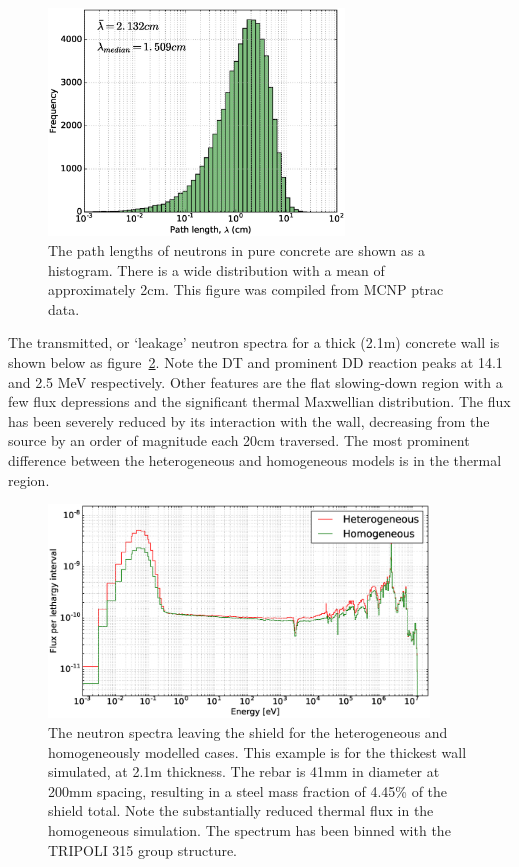 \begin{figure}[H]
  \centering
  \includegraphics[width=0.7\textwidth]{mfp}
  \caption{The path lengths of neutrons in pure concrete are shown as a histogram. There is a wide distribution with a mean of approximately 2cm. This figure was compiled from MCNP ptrac data.}
  \label{fig:mfp}
\end{figure}

The transmitted, or `leakage' neutron spectra for a thick (2.1m) concrete wall is shown below as figure~\ref{fig:trans_neutron_spec}. Note the DT and prominent DD reaction peaks at 14.1 and 2.5 MeV respectively. Other features are the flat slowing-down region with a few flux depressions and the significant thermal Maxwellian distribution. The flux has been severely reduced by its interaction with the wall, decreasing from the source by an order of magnitude each 20cm traversed. The most prominent difference between the heterogeneous and homogeneous models is in the thermal region. 

\begin{figure}[H]
  \centering
  \includegraphics[width=0.9\textwidth]{transmitted_neutron_spectra}
  \caption{The neutron spectra leaving the shield for the heterogeneous and homogeneously modelled cases. This example is for the thickest wall simulated, at 2.1m thickness. The rebar is 41mm in diameter at 200mm spacing, resulting in a steel mass fraction of 4.45\% of the shield total. Note the substantially reduced thermal flux in the homogeneous simulation. The spectrum has been binned with the TRIPOLI 315 group structure.}
  \label{fig:trans_neutron_spec}
\end{figure}

